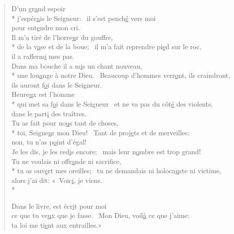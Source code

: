 
\begin{verse}
D’un gr\underline{a}nd espoir \\*
j’espér\underline{a}is le Seigneur:~\psalmstar
il s’est pench\underline{é} vers moi \\
pour ent\underline{e}ndre mon cri. \\

Il m’a tiré de l’horre\underline{u}r du gouffre, \\*
de la v\underline{a}se et de la boue;~\psalmstar
il m’a fait reprendre pi\underline{e}d sur le roc, \\
il a rafferm\underline{i} mes pas. \\

Dans ma bouche il a m\underline{i}s un chant nouveau, \\*
une lou\underline{a}nge à notre Dieu.~\psalmstar
Beaucoup d’hommes verr\underline{o}nt, ils craindront, \\
ils auront f\underline{o}i dans le Seigneur. \\

Heure\underline{u}x est l’homme \\*
qui met sa f\underline{o}i dans le Seigneur~\psalmstar
et ne va pas du côt\underline{é} des violents, \\
dans le part\underline{i} des traîtres. \\

Tu as fait pour no\underline{u}s tant de choses, \\*
toi, Seigne\underline{u}r mon Dieu!~\psalmstar
Tant de proj\underline{e}ts et de merveilles: \\
non, tu n’as p\underline{o}int d’égal! \\

Je les dis, je les red\underline{i}s encore;~\psalmstar
mais leur n\underline{o}mbre est trop grand! \\

Tu ne voulais ni offr\underline{a}nde ni sacrifice, \\*
tu as ouv\underline{e}rt mes oreilles;~\psalmstar
tu ne demandais ni holoca\underline{u}ste ni victime, \\
alors j’ai dit: « Voic\underline{i}, je viens. \\*

Dans le livre, est écr\underline{i}t pour moi \\
ce que tu ve\underline{u}x que je fasse.~\psalmstar
Mon Dieu, voil\underline{à} ce que j’aime: \\
ta loi me ti\underline{e}nt aux entrailles.» \\


\end{verse}
